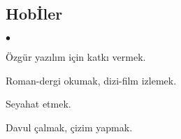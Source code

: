 \documentclass[margin,line]{res}
\newenvironment{list2}{
  \begin{list}{$\bullet$}{%
      \setlength{\itemsep}{0in}
      \setlength{\parsep}{0in} \setlength{\parskip}{0in}
      \setlength{\topsep}{0in} \setlength{\partopsep}{0in}
      \setlength{\leftmargin}{0.1in}}}{\end{list}}
\begin{document}
\begin{resume}
\vspace{-.3cm}
\section{\sc Hob\.{I}ler}
\begin{list2}
\item \"{O}zg\"{u}r yaz{\i}l{\i}m i\c{c}in katk{\i} vermek.
\item Roman-dergi okumak, dizi-film izlemek.
\item Seyahat etmek.
\item Davul \c{c}almak, \c{c}izim yapmak.
\end{list2}

\end{resume}
\end{document}
